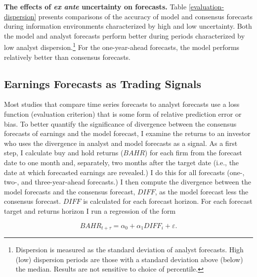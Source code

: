 \documentclass[12pt, letterpaper]{article}
\begin{document}
\textbf{The effects of \emph{ex ante} uncertainty on forecasts.} Table \ref{evaluation-dispersion}
presents comparisons of the accuracy of model and consensus forecasts during information 
environments characterized by high and low uncertainty. Both the model and analyst forecasts 
perform better during periods characterized by low analyst dispersion.\footnote{Dispersion is 
measured as the standard deviation of analyst forecasts. High (low) dispersion periods are those
with a standard deviation above (below) the median. Results are not sensitive to choice of 
percentile.} For the one-year-ahead forecasts, the model performs relatively better than consensus
forecasts.



\subsection{Earnings Forecasts as Trading Signals}
Most studies that compare time series forecasts to analyst forecasts use a loss function (evaluation
criterion) that is some form of relative prediction error or bias. To better quantify the 
significance of divergence between the consensus forecasts of earnings and the model forecast, I 
examine the returns
to an investor who uses the divergence in analyst and model forecasts as a signal. As a first step,
I calculate buy and hold returns ($BAHR$) for each firm from the forecast date to one month and, 
separately,
two months after the target date (i.e., the date at which forecasted earnings are revealed.) I do 
this for all forecasts (one-, two-, and three-year-ahead forecasts.) I then compute the divergence
between the model forecasts and the consensus forecast, $DIFF$, as the model forecast less the 
consensus forecast. $DIFF$ is calculated for each forecast horizon. For each forecast target and 
returns horizon I run a regression of the form

\begin{equation}
BAHR_{t+\tau} = \alpha_{0} + \alpha_{1}DIFF_{i} + \varepsilon.
\end{equation}
\end{document}
